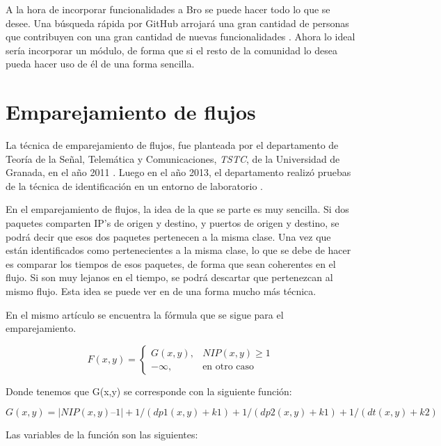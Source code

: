 \intro A la hora de incorporar funcionalidades a Bro se puede hacer todo lo que se desee. Una búsqueda rápida 
por GitHub arrojará una gran cantidad de personas que contribuyen con una gran cantidad de nuevas 
funcionalidades \citep{gitbeacon}. Ahora lo ideal sería incorporar un módulo, de forma que si el resto 
de la comunidad lo desea pueda hacer uso de él de una forma sencilla.

\section{Emparejamiento de flujos}

La técnica de emparejamiento de flujos, fue planteada por el departamento de Teoría de la Señal, 
Telemática y Comunicaciones, \textit{TSTC}, de la Universidad de Granada, en el año 2011 \cite{presentacion}. 
Luego en el año 2013, el departamento realizó pruebas de la técnica de identificación en un entorno de 
laboratorio \cite{comparacion}.

\intro En el emparejamiento de flujos, la idea de la que se parte es muy sencilla. Si dos paquetes comparten 
IP's de origen y destino, y puertos de origen y destino, se podrá decir que esos dos paquetes pertenecen a 
la misma clase. Una vez que están identificados como pertenecientes a la misma clase, lo que se debe de hacer 
es comparar los tiempos de esos paquetes, de forma que sean coherentes en el flujo. Si son muy lejanos en el 
tiempo, se podrá descartar que pertenezcan al mismo flujo. Esta idea se puede ver en \cite{comparacion} de una 
forma mucho más técnica.

\intro En el mismo artículo se encuentra la fórmula que se sigue para el emparejamiento.

\begin{equation*}
	F(x,y)=
 	\begin{cases}
	  G(x,y), & NIP(x,y) \geq 1 \\
	  -\infty, & \text{en otro caso}
	 \end{cases}
\end{equation*}

\intro Donde tenemos que G(x,y) se corresponde con la siguiente función:

\begin{displaymath}
G(x,y) = |NIP(x,y) – 1| + 1 / (dp1(x,y) + k1) + 1 / (dp2(x,y) + k1) + 1 / (dt(x,y) + k2)
\end{displaymath}

\intro Las variables de la función son las siguientes: 

